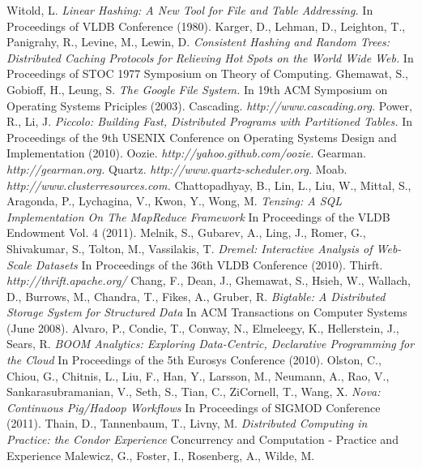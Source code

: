 \documentclass[11pt,a4paper,twoside]{report}
\begin{document}
\begin{thebibliography}{23}
 Witold, L.
 {\em Linear Hashing: A New Tool for File and Table Addressing.}
 In Proceedings of VLDB Conference (1980).
 Karger, D., Lehman, D., Leighton, T., Panigrahy, R., Levine, M., Lewin, D.
 {\em Consistent Hashing and Random Trees: Distributed Caching Protocols for
 Relieving Hot Spots on the World Wide Web.}
 In Proceedings of STOC 1977 Symposium on Theory of Computing.
 Ghemawat, S., Gobioff, H., Leung, S.
 {\em The Google File System.}
 In 19th ACM Symposium on Operating Systems Priciples (2003).
 Cascading.
 {\em http://www.cascading.org.}
 Power, R., Li, J.
 {\em Piccolo: Building Fast, Distributed Programs with Partitioned Tables.}
 In Proceedings of the 9th USENIX Conference on Operating Systems Design and
 Implementation (2010).
 Oozie.
 {\em http://yahoo.github.com/oozie.}
 Gearman.
 {\em http://gearman.org.}
 Quartz.
 {\em http://www.quartz-scheduler.org.}
 Moab.
 {\em http://www.clusterresources.com.}
 Chattopadhyay, B., Lin, L., Liu, W., Mittal, S., Aragonda, P., Lychagina, V.,
 Kwon, Y., Wong, M.
 {\em Tenzing: A SQL Implementation On The MapReduce Framework}
 In Proceedings of the VLDB Endowment Vol. 4 (2011).
 Melnik, S., Gubarev, A., Ling, J., Romer, G., Shivakumar, S., Tolton, M.,
 Vassilakis, T.
 {\em Dremel: Interactive Analysis of Web-Scale Datasets}
 In Proceedings of the 36th VLDB Conference (2010).
 Thirft.
 {\em http://thrift.apache.org/}
 Chang, F., Dean, J., Ghemawat, S., Hsieh, W., Wallach, D., Burrows, M.,
 Chandra, T., Fikes, A., Gruber, R.
 {\em Bigtable: A Distributed Storage System for Structured Data}
 In ACM Transactions on Computer Systems (June 2008).
 Alvaro, P., Condie, T., Conway, N., Elmeleegy, K., Hellerstein, J., Sears, R.
 {\em BOOM Analytics: Exploring Data-Centric, Declarative Programming for the
Cloud}
 In Proceedings of the 5th Eurosys Conference (2010).
 Olston, C., Chiou, G., Chitnis, L., Liu, F., Han, Y., Larsson, M., Neumann, A.,
 Rao, V., Sankarasubramanian, V., Seth, S., Tian, C., ZiCornell, T., Wang, X.
 {\em Nova: Continuous Pig/Hadoop Workflows}
 In Proceedings of SIGMOD Conference (2011).
 Thain, D., Tannenbaum, T., Livny, M.
 {\em Distributed Computing in Practice: the Condor Experience}
 Concurrency and Computation - Practice and Experience
 Malewicz, G., Foster, I., Rosenberg, A., Wilde, M.

\end{thebibliography}
\end{document}
